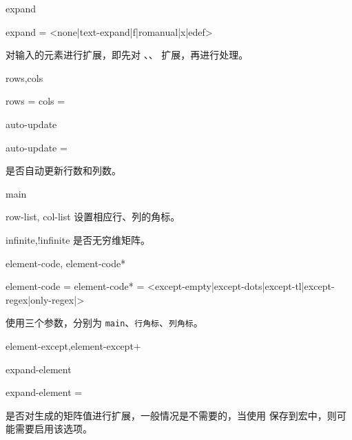 \documentclass{ctxdoc}
\begin{document}
\begin{function}{expand}
    \begin{syntax}
        expand = <none|text-expand|f|romanual|x|edef> 
    \end{syntax}
    对输入的元素进行扩展，即先对 、、 扩展，再进行处理。
\end{function}

\begin{function}{rows,cols}
    \begin{syntax}
        rows = 
        cols = 
    \end{syntax}
\end{function}

\begin{function}{auto-update}
    \begin{syntax}
        auto-update = \TTF {}
    \end{syntax}
    是否自动更新行数和列数。
\end{function}

\begin{function}{main}
\end{function}

\begin{function}{row-list, col-list}
    设置相应行、列的角标。
\end{function}

\begin{function}{infinite,!infinite}
    是否无穷维矩阵。
\end{function}

\begin{function}{element-code, element-code*}
    \begin{syntax}
        element-code  = 
        element-code* = <except-empty|except-dots|except-tl|except-regex|only-regex|>
    \end{syntax}
     使用三个参数，分别为 \verb|main|、\verb|行角标|、\verb|列角标|。
\end{function}

\begin{function}{element-except,element-except+}
\end{function}

\begin{function}{expand-element}
    \begin{syntax}
        expand-element = \TTF {}
    \end{syntax}
    是否对生成的矩阵值进行扩展，一般情况是不需要的，当使用  保存到宏中，则可能需要启用该选项。
\end{function}
\end{document}
